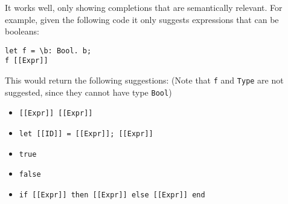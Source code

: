 It works well, only showing completions that are semantically relevant. For example, given the following code it only suggests expressions that can be booleans:
\begin{lstlisting}
let f = \b: Bool. b;
f [[Expr]]
\end{lstlisting}
This would return the following suggestions: (Note that \verb|f| and \verb|Type| are not suggested, since they cannot have type \verb|Bool|)
 \begin{itemize}
 	\item \verb|[[Expr]] [[Expr]]|
 	\item \verb|let [[ID]] = [[Expr]]; [[Expr]]|
 	\item \verb|true|
 	\item \verb|false|
 	\item \verb|if [[Expr]] then [[Expr]] else [[Expr]] end|
 \end{itemize}
